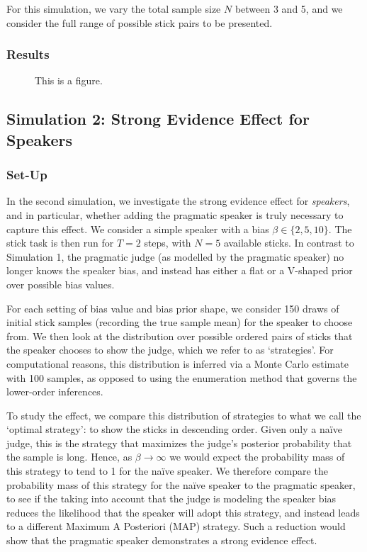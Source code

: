 \documentclass[10pt,letterpaper]{article}
\begin{document}
For this simulation, we vary the total sample size $N$ between 3 and 5, and we consider the full range of possible stick pairs to
be presented.

\subsubsection{Results}

\begin{figure}[H]
\begin{center}
\end{center}
\caption{This is a figure.} 
\label{wee}
\end{figure}

\subsection{Simulation 2: Strong Evidence Effect for Speakers}
\subsubsection{Set-Up}
In the second simulation, we investigate the strong evidence effect for \textit{speakers}, and in particular, whether adding the 
pragmatic speaker is truly necessary to capture this effect. We consider a simple speaker with a bias $\beta\in\{2, 5, 10\}$.
The stick task is then run for $T=2$ steps, with $N=5$ available sticks. In contrast to Simulation 1, the pragmatic judge 
(as modelled by the pragmatic speaker) no longer knows the speaker bias, and instead has either a flat or a V-shaped prior over possible bias values.

For each setting of bias value and bias prior shape, we consider 150 draws of initial stick samples (recording the true sample mean)
for the speaker to choose from.
We then look at the distribution over possible ordered pairs of sticks that the speaker chooses to show the judge, 
which we refer to as `strategies'. For computational reasons, this distribution is inferred via a Monte Carlo estimate with 100 samples,
as opposed to using the enumeration method that governs the lower-order inferences.

To study the effect, we compare this distribution of strategies to what we call the `optimal strategy': to show the sticks in descending order.
Given only a na\"ive judge, this is the strategy that maximizes the judge's posterior probability that the sample is long. Hence, as 
$\beta\to\infty$ we would expect the probability mass of this strategy to tend to 1 for the na\"ive speaker. We therefore compare the probability mass of this 
strategy for the na\"ive speaker to the pragmatic speaker, to see if the taking into account that the judge is modeling the speaker bias reduces the 
likelihood that the speaker will adopt this strategy, and instead leads to a different Maximum A Posteriori (MAP) strategy. Such
a reduction would show that the pragmatic speaker demonstrates a strong evidence effect.
\end{document}
